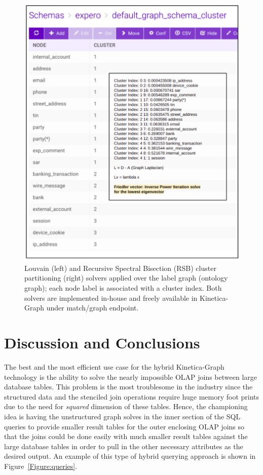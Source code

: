 \documentclass[preprint,3p,twocolumn]{elsarticle}
\begin{document}
\begin{figure}
\centering
    \includegraphics[width=0.9\linewidth, keepaspectratio]{clusters.pdf} 
    \caption{Louvain (left) and Recursive Spectral Bisection (RSB) cluster partitioning (right) solvers applied over the label graph (ontology graph); each node label is associated with a cluster index. Both solvers are implemented in-house and freely available in Kinetica-Graph under match/graph endpoint.}
    \label{Figure:clusters}
\end{figure}

\section{Discussion and Conclusions}
\label{Section:Conclusions}

The best and the most efficient use case for the hybrid  Kinetica-Graph technology is the ability to solve the nearly impossible OLAP joins between large database tables. This problem is the most troublesome in the industry since the structured data and the  stenciled join operations require huge  memory foot prints due to the need for \textit{squared} dimension of these tables. Hence, the championing idea is having the unstructured graph solves in the inner section of the SQL queries to provide smaller result tables for the outer enclosing OLAP joins so that the joins could be done easily with much smaller result tables against the large database tables in order to pull in the other necessary attributes as the desired output. An example of this type of hybrid querying approach is shown in Figure~\ref{Figure:queries}. 
\end{document}

